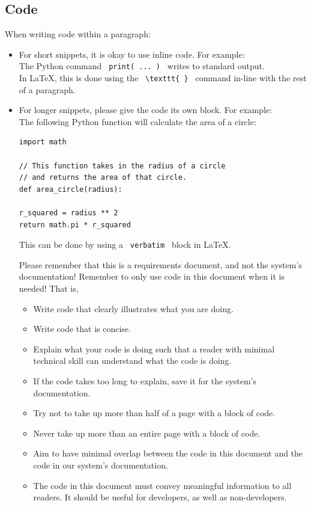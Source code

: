\documentclass{scrreprt}
\begin{document}
\subsection{Code}
When writing code within a paragraph:
\begin{itemize}
\item For short snippets, it is okay to use inline code. For example: \\
The \gls{Python} command \texttt{ print( ... ) } writes to standard output. \\
In \gls{LaTeX}, this is done using the \texttt{ \textbackslash texttt\{ \} } command in-line with the rest of a paragraph.
\item For longer snippets, please give the code its own block. For example: \\
The following \gls{Python} function will calculate the area of a circle: \\
\begin {verbatim}
import math

// This function takes in the radius of a circle
// and returns the area of that circle.
def area_circle(radius):

r_squared = radius ** 2
return math.pi * r_squared
\end{verbatim}
This can be done by using a \texttt{ verbatim } block in \gls{LaTeX}.  

Please remember that this is a requirements document, and not the system's \gls{documentation}!
Remember to only use code in this document when it is needed!
That is,
\begin{itemize}
    \item Write code that clearly illustrates what you are doing.
    \item Write code that is concise.
    \item Explain what your code is doing such that a reader with minimal technical skill can understand what the code is doing.
    \item If the code takes too long to explain, save it for the system's \gls{documentation}.
    \item Try not to take up more than half of a page with a block of code.
    \item Never take up more than an entire page with a block of code.
    \item Aim to have minimal overlap between the code in this document and the code in our system's \gls{documentation}.
    \item The code in this document must convey meaningful information to all readers.
          It should be useful for developers, as well as non-developers.
\end{itemize}
\end{itemize}
$ $
\end{document}
